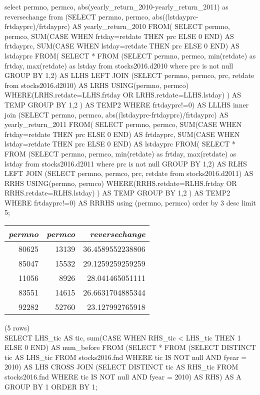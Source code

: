 select permno, permco, abs(yearly_return_2010-yearly_return_2011) as reversechange
from
(SELECT permno, permco, abs((lstdayprc-frtdayprc)/frtdayprc) AS yearly_return_2010
FROM(
SELECT
 permno, permco,
 SUM(CASE WHEN frtday=retdate THEN prc ELSE 0 END) AS frtdayprc,
 SUM(CASE WHEN lstday=retdate THEN prc ELSE 0 END) AS lstdayprc
FROM(
SELECT * FROM
(SELECT permno, permco, min(retdate) as frtday, max(retdate) as lstday from stocks2016.d2010
where prc is not null
GROUP BY 1,2) AS LLHS
LEFT JOIN
(SELECT permno, permco, prc, retdate from stocks2016.d2010) AS LRHS
USING(permno, permco)
WHERE(LRHS.retdate=LLHS.frtday OR LRHS.retdate=LLHS.lstday)
) AS TEMP
GROUP BY 1,2
) AS TEMP2
WHERE frtdayprc!=0) AS LLLHS
inner join
(SELECT permno, permco, abs((lstdayprc-frtdayprc)/frtdayprc) AS yearly_return_2011
FROM(
SELECT
 permno, permco,
 SUM(CASE WHEN frtday=retdate THEN prc ELSE 0 END) AS frtdayprc,
 SUM(CASE WHEN lstday=retdate THEN prc ELSE 0 END) AS lstdayprc
FROM(
SELECT * FROM
(SELECT permno, permco, min(retdate) as frtday, max(retdate) as lstday from stocks2016.d2011
where prc is not null
GROUP BY 1,2) AS RLHS
LEFT JOIN
(SELECT permno, permco, prc, retdate from stocks2016.d2011) AS RRHS
USING(permno, permco)
WHERE(RRHS.retdate=RLHS.frtday OR RRHS.retdate=RLHS.lstday)
) AS TEMP
GROUP BY 1,2
) AS TEMP2
WHERE frtdayprc!=0) AS RRRHS
using (permno, permco)
order by 3 desc
limit 5;
\begin{tabular}{r | r | r}
\textit{permno} & \textit{permco} & \textit{reversechange} \\
\hline
80625 & 13139 & 36.4589552238806 \\
85047 & 15532 & 29.1259259259259 \\
11056 & 8926 & 28.041465051111 \\
83551 & 14615 & 26.6631704885344 \\
92282 & 52760 & 23.127992765918 \\
\end{tabular}

\noindent (5 rows) \\

SELECT LHS_tic AS tic,
 sum(CASE
   WHEN RHS_tic < LHS_tic THEN 1
   ELSE 0
 END) AS num_before
FROM
 (SELECT * FROM
   (SELECT DISTINCT tic AS LHS_tic FROM stocks2016.fnd
   WHERE tic IS NOT null AND fyear = 2010) AS LHS
 CROSS JOIN
   (SELECT DISTINCT tic AS RHS_tic FROM stocks2016.fnd
   WHERE tic IS NOT null AND fyear = 2010) AS RHS) AS A
GROUP BY 1
ORDER BY 1;
